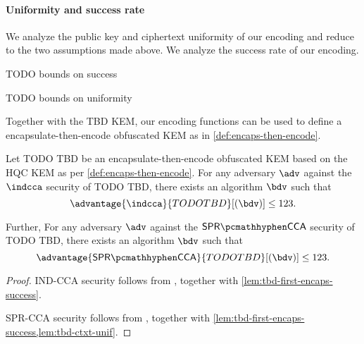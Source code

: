 \paragraph{Uniformity and success rate}

We analyze the public key and ciphertext uniformity of our encoding and reduce to the two assumptions made above. We analyze the success rate of our encoding.

\begin{lemma}[[First-encaps Success Probability of TODO TBD]
\label{lem:hqc-first-encaps-success}
    TODO bounds on success
\end{lemma}

\begin{lemma}
\label{lem:hqc-ctxt-unif}
    TODO bounds on uniformity
\end{lemma}

Together with the TBD KEM, our encoding functions can be used to define a encapsulate-then-encode obfuscated KEM as in \cref{def:encaps-then-encode}.

\begin{theorem}
    Let TODO TBD be an encapsulate-then-encode obfuscated KEM based on the HQC KEM as per \cref{def:encaps-then-encode}. For any adversary $\adv$ against the $\indcca$ security of TODO TBD, there exists an algorithm $\bdv$ such that
    \[ \advantage{\indcca}{TODO TBD}[(\bdv)] \leq 123. \]

    Further,  For any adversary $\adv$ against the $\sprcca$ security of TODO TBD, there exists an algorithm $\bdv$ such that
    \[ \advantage{\sprcca}{TODO TBD}[(\bdv)] \leq 123. \]
\end{theorem}
\begin{proof}
    IND-CCA security follows from \cite[Theorem~2.12]{CCS:GunSteVei24}, together with \cref{lem:tbd-first-encaps-success}.
    
    SPR-CCA security follows from \cite[Theorem~2.13]{CCS:GunSteVei24}, together with \cref{lem:tbd-first-encaps-success,lem:tbd-ctxt-unif}.
\end{proof}